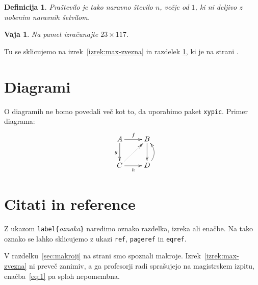\documentclass{amsart}
\newtheorem{definicija}[izrek]{Definicija}
\newtheorem{vaja}[izrek]{Vaja}
\begin{document}
\begin{definicija}
  \emph{Praštevilo} je tako naravno število $n$, večje od $1$, ki ni deljivo z nobenim
  naravnih šetvilom.
\end{definicija}

\begin{vaja}
  Na pamet izračunajte $23 \times 117$.
\end{vaja}

Tu se sklicujemo na izrek~\ref{izrek:max-zvezna} in razdelek \ref{sec:diagrami}, ki je na strani \pageref{sec:diagrami}.

\section{Diagrami}
\label{sec:diagrami}

O diagramih ne bomo povedali več kot to, da uporabimo paket \texttt{xypic}. Primer diagrama:
%
\begin{equation*}
  \xymatrix{
    {A}
    \ar[r]^{f}
    \ar[d]_{g}
    &
    {B}
    \ar[d]
    \\
    {C}
    \ar[r]_{h}
    \ar@{.>>}[ru]
    &
    {D}
    \ar@/_1em/[u]
  }
\end{equation*}

\section{Citati in reference}
\label{sec:citati}

Z ukazom \verb|label{|\emph{oznaka}\verb|}| naredimo oznako razdelka, izreka ali enačbe. Na tako oznako se lahko sklicujemo z ukazi \verb|ref|, \verb|pageref| in \verb|eqref|.

V razdelku~\ref{sec:makroji} na strani \pageref{sec:makroji} smo spoznali makroje.
Izrek~\ref{izrek:max-zvezna} ni preveč zanimiv, a ga profesorji radi sprašujejo na
magistrskem izpitu, enačba~\eqref{eq:1} pa sploh nepomembna.
\end{document}
